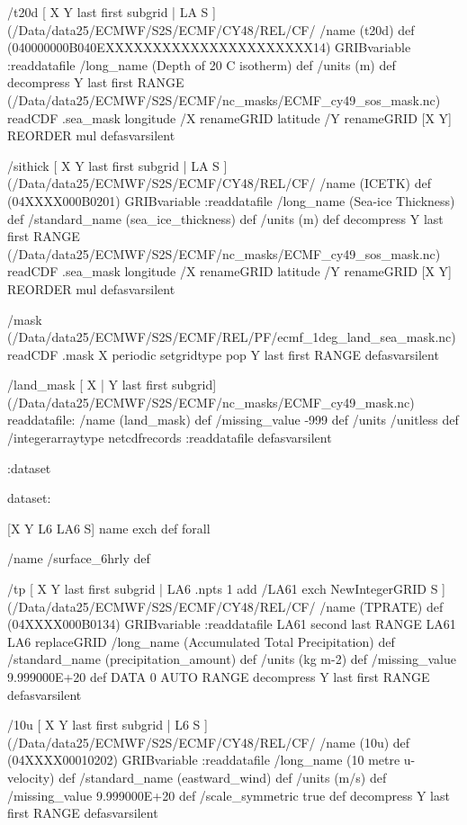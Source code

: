 \begin{ingrid}
/t20d { [ X Y last first subgrid | LA S ] (/Data/data25/ECMWF/S2S/ECMF/CY48/REL/CF/%
/name (t20d) def
 (040000000B040EXXXXXXXXXXXXXXXXXXXXXX14) GRIBvariable
:readdatafile
/long_name (Depth of 20 C isotherm) def
/units (m) def
decompress
 Y last first RANGE
 (/Data/data25/ECMWF/S2S/ECMF/nc_masks/ECMF_cy49_sos_mask.nc) readCDF .sea_mask
   longitude /X renameGRID
   latitude /Y renameGRID
   [X Y] REORDER
mul
} defasvarsilent

/sithick { [ X Y last first subgrid | LA S ] (/Data/data25/ECMWF/S2S/ECMF/CY48/REL/CF/%
/name (ICETK) def
(04XXXX000B0201) GRIBvariable
:readdatafile
/long_name (Sea-ice Thickness) def
/standard_name (sea_ice_thickness) def
/units (m) def
decompress
 Y last first RANGE
 (/Data/data25/ECMWF/S2S/ECMF/nc_masks/ECMF_cy49_sos_mask.nc) readCDF .sea_mask
   longitude /X renameGRID
   latitude /Y renameGRID
   [X Y] REORDER
mul
} defasvarsilent


/mask { (/Data/data25/ECMWF/S2S/ECMF/REL/PF/ecmf_1deg_land_sea_mask.nc) readCDF .mask
X periodic setgridtype pop
Y last first RANGE
} defasvarsilent

/land_mask{
[ X | Y last first subgrid] (/Data/data25/ECMWF/S2S/ECMF/nc_masks/ECMF_cy49_mask.nc)  readdatafile:
/name (land_mask) def
 /missing_value -999 def
 /units /unitless def
 /integerarraytype netcdfrecords :readdatafile
}defasvarsilent

:dataset



dataset:

[X Y L6 LA6 S] {name exch def } forall

/name /surface_6hrly def

/tp { [ X Y last first subgrid | LA6 .npts 1 add /LA61 exch NewIntegerGRID S ] (/Data/data25/ECMWF/S2S/ECMF/CY48/REL/CF/%
/name (TPRATE) def
(04XXXX000B0134) GRIBvariable
:readdatafile
LA61 second last RANGE
LA61 LA6 replaceGRID 
/long_name (Accumulated Total Precipitation) def
/standard_name (precipitation_amount) def
/units (kg m-2) def
/missing_value 9.999000E+20 def
DATA 0 AUTO RANGE
decompress
Y last first RANGE
} defasvarsilent

/10u { [ X Y last first subgrid | L6 S ] (/Data/data25/ECMWF/S2S/ECMF/CY48/REL/CF/%
/name (10u) def
(04XXXX00010202) GRIBvariable
:readdatafile
/long_name (10 metre u-velocity) def
/standard_name (eastward_wind) def
/units (m/s) def
/missing_value 9.999000E+20 def
/scale_symmetric true def
decompress
Y last first RANGE
} defasvarsilent


\end{ingrid}
